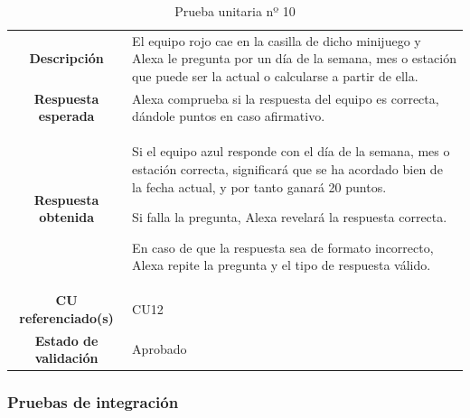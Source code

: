 \begin{table}[H]
	\centering
	\begin{tabular}{|c|p{9cm}|}
		\hline
		\rowcolor{lightgray}
		\multicolumn{2}{|c|}{\textbf{PU10}: Minijuego recuerda la fecha} \\
		\hline
		\textbf{Descripción} & El equipo rojo cae en la casilla de dicho minijuego y Alexa le pregunta por un día de la semana, mes o estación que puede ser la actual o calcularse a partir de ella.
		\vspace{0.2cm} \\
		\hline
		\textbf{Respuesta esperada} & Alexa comprueba si la respuesta del equipo es correcta, dándole puntos en caso afirmativo. \vspace{0.2cm} \\
		\hline
		\textbf{Respuesta obtenida} & Si el equipo azul responde con el día de la semana, mes o estación correcta, significará que se ha acordado bien de la fecha actual, y por tanto ganará 20 puntos.
		
		Si falla la pregunta, Alexa revelará la respuesta correcta.
		
		En caso de que la respuesta sea de formato incorrecto, Alexa repite la pregunta y el tipo de respuesta válido. \\
		\hline
		\textbf{CU referenciado(s)} & CU12 \vspace{0.2cm} \\
		\hline
		\textbf{Estado de validación} & Aprobado \vspace{0.2cm} \\
		\hline
	\end{tabular}
	\caption{Prueba unitaria nº 10}
	\label{tab:PU10}
\end{table}

\subsubsection{Pruebas de integración}

